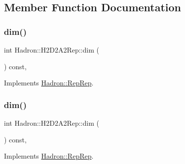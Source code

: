\subsection{Member Function Documentation}
\mbox{\label{structHadron_1_1H2D2A2Rep_aca0f53f952eae12ac23f9cc429108dcc}} 
\subsubsection{\texorpdfstring{dim()}{dim()}\hspace{0.1cm}{\footnotesize\ttfamily [1/5]}}
{\footnotesize\ttfamily int Hadron\+::\+H2\+D2\+A2\+Rep\+::dim (\begin{DoxyParamCaption}{ }\end{DoxyParamCaption}) const\hspace{0.3cm}{\ttfamily [inline]}, {\ttfamily [virtual]}}



Implements \mbox{\hyperlink{structHadron_1_1RepRep_a92c8802e5ed7afd7da43ccfd5b7cd92b}{Hadron\+::\+Rep\+Rep}}.

\mbox{\label{structHadron_1_1H2D2A2Rep_aca0f53f952eae12ac23f9cc429108dcc}} 
\subsubsection{\texorpdfstring{dim()}{dim()}\hspace{0.1cm}{\footnotesize\ttfamily [2/5]}}
{\footnotesize\ttfamily int Hadron\+::\+H2\+D2\+A2\+Rep\+::dim (\begin{DoxyParamCaption}{ }\end{DoxyParamCaption}) const\hspace{0.3cm}{\ttfamily [inline]}, {\ttfamily [virtual]}}



Implements \mbox{\hyperlink{structHadron_1_1RepRep_a92c8802e5ed7afd7da43ccfd5b7cd92b}{Hadron\+::\+Rep\+Rep}}.

\mbox{\label{structHadron_1_1H2D2A2Rep_aca0f53f952eae12ac23f9cc429108dcc}} 
